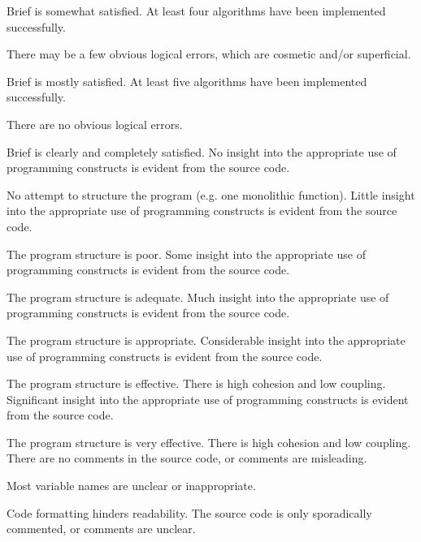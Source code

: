 \documentclass{../../fal_assignment}
\begin{document}
\begin{markingrubric}
            \par		Brief is somewhat satisfied.
        \grade 		At least four algorithms have been implemented successfully.
            \par 		There may be a few obvious logical errors, which are cosmetic and/or superficial.     
            \par		Brief is mostly satisfied. 
        \grade 		At least five algorithms have been implemented successfully.
            \par		There are no obvious logical errors.
            \par		Brief is clearly and completely satisfied.
%
        \grade\fail No insight into the appropriate use of programming constructs is evident from the source code.
            \par No attempt to structure the program (e.g. one monolithic function).
        \grade Little insight into the appropriate use of programming constructs is evident from the source code.
            \par The program structure is poor.
        \grade Some insight into the appropriate use of programming constructs is evident from the source code.
            \par The program structure is adequate.
        \grade Much insight into the appropriate use of programming constructs is evident from the source code.
            \par The program structure is appropriate.
        \grade Considerable insight into the appropriate use of programming constructs is evident from the source code.
            \par The program structure is effective. There is high cohesion and low coupling.
        \grade Significant insight into the appropriate use of programming constructs is evident from the source code.
            \par The program structure is very effective. There is high cohesion and low coupling.
%
        \grade\fail There are no comments in the source code, or comments are misleading.
            \par Most variable names are unclear or inappropriate.
            \par Code formatting hinders readability.
        \grade The source code is only sporadically commented, or comments are unclear.

\end{markingrubric}
\end{document}
